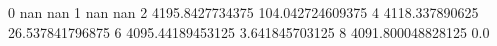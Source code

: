 0 nan nan
1 nan nan
2 4195.8427734375 104.042724609375
4 4118.337890625 26.537841796875
6 4095.44189453125 3.641845703125
8 4091.800048828125 0.0
